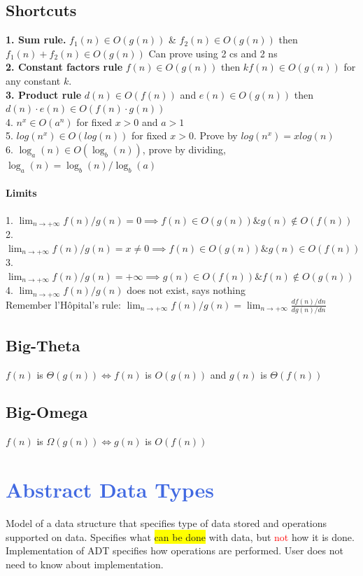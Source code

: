 \subsection{Shortcuts}
\textbf{1. Sum rule.} $f_1(n)\in O(g(n))$ \& $f_2(n)\in O(g(n))$ then $f_1(n)+f_2(n)\in O(g(n))$ Can prove using 2 cs and 2 ns
\\\textbf{2. Constant factors rule} $f(n)\in O(g(n))$ then $kf(n)\in O(g(n))$ for any constant $k$. 
\\\textbf{3. Product rule} $d(n)\in O(f(n))$ and $e(n)\in O(g(n))$ then $d(n)\cdot e(n)\in O(f(n)\cdot g(n))$
\\ 4. $n^x \in O(a^n)$ for fixed $x>0$ and $a>1$
\\ 5. $log(n^x)\in O(log(n))$ for fixed $x>0$. Prove by $log(n^x)=x log(n)$
\\ 6. $\log_a(n)\in O(\log_b(n))$, prove by dividing, $\log_a(n)=\log_b(n)/\log_b(a)$
\vspace{-7 pt}
\paragraph{Limits}
1. $\lim_{n\to +\infty}f(n)/g(n)=0\implies f(n)\in O(g(n)) \& g(n)\notin O(f(n))$
\\2. $\lim_{n\to +\infty}f(n)/g(n)=x\neq 0\implies f(n)\in O(g(n)) \& g(n)\in O(f(n))$
\\3. $\lim_{n\to +\infty}f(n)/g(n)=+\infty \implies g(n)\in O(f(n)) \& f(n)\notin O(g(n))$
\\4. $\lim_{n\to +\infty}f(n)/g(n)$ does not exist, says nothing
\\ Remember l'H\^opital's rule: $\lim_{n\to +\infty} f(n)/g(n)=\lim_{n\to +\infty} \frac{df(n)/dn}{dg(n)/dn}$
\subsection{Big-Theta}
$f(n)$ is $\Theta(g(n)) \iff f(n)$ is $O(g(n))$ and $g(n)$ is $\Theta(f(n))$
\subsection{Big-Omega}
$f(n)$ is $\Omega(g(n)) \iff g(n)$ is $O(f(n))$
\color{RoyalBlue}
\section{\textcolor{RoyalBlue}{Abstract Data Types}}
Model of a data structure that specifies type of data stored and operations supported on data. Specifies what \colorbox{Yellow}{can be done} with data, but \textcolor{Red}{not} how it is done. Implementation of ADT specifies how operations are performed. User does not need to know about implementation.
